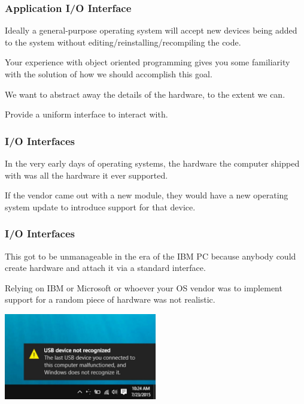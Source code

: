 \begin{frame}
\frametitle{Application I/O Interface}

Ideally a general-purpose operating system will accept new devices being added to the system without editing/reinstalling/recompiling the code. 

Your experience with object oriented programming gives you some familiarity with the solution of how we should accomplish this goal. 

We want to abstract away the details of the hardware, to the extent we can. 

Provide a uniform \alert{interface} to interact with. 

\end{frame}

\begin{frame}
\frametitle{I/O Interfaces}

In the very early days of operating systems, the hardware the computer shipped with was all the hardware it ever supported. 

If the vendor came out with a new module, they would have a new operating system update to introduce support for that device.


\end{frame}

\begin{frame}
\frametitle{I/O Interfaces} 

This got to be unmanageable in the era of the IBM PC because anybody could create hardware and attach it via a standard interface. 

Relying on IBM or Microsoft or whoever your OS vendor was to implement support for a random piece of hardware was not realistic.

\begin{center}
	\includegraphics[width=0.5\textwidth]{images/notrecognized.jpg}
\end{center}

\end{frame}

